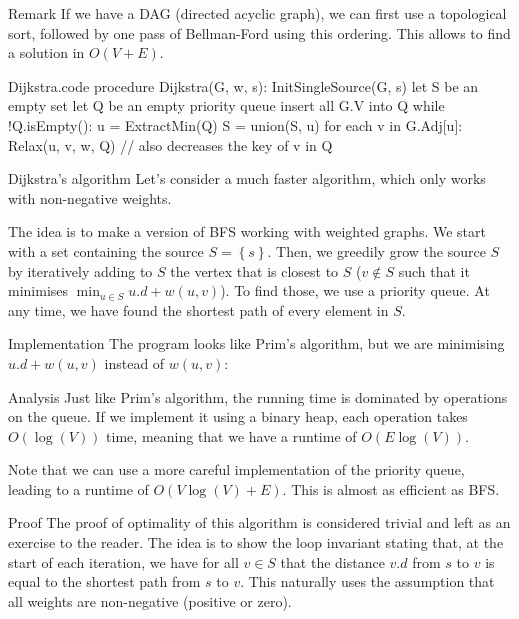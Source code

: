 \documentclass[a4paper]{article}
\begin{document}
\begin{parag}{Remark}
    If we have a DAG (directed acyclic graph), we can first use a topological sort, followed by one pass of Bellman-Ford using this ordering. This allows to find a solution in $O\left(V + E\right)$.
\end{parag}

\begin{filecontents*}[overwrite]{Dijkstra.code}
procedure Dijkstra(G, w, s):
    InitSingleSource(G, s)
    let S be an empty set
    let Q be an empty priority queue
    insert all G.V into Q
    while !Q.isEmpty():
        u = ExtractMin(Q)
        S = union(S, u)
        for each v in G.Adj[u]:
            Relax(u, v, w, Q)  // also decreases the key of v in Q
\end{filecontents*}


\begin{parag}{Dijkstra's algorithm}
    Let's consider a much faster algorithm, which only works with non-negative weights. 

    The idea is to make a version of BFS working with weighted graphs. We start with a set containing the source $S = \left\{s\right\}$. Then, we greedily grow the source $S$ by iteratively adding to $S$ the vertex that is closest to $S$ ($v \not\in S$ such that it minimises $\min_{u \in S} u.d + w\left(u, v\right)$). To find those, we use a priority queue. At any time, we have found the shortest path of every element in $S$.

    \begin{subparag}{Implementation}
        The program looks like Prim's algorithm, but we are minimising $u.d + w\left(u, v\right)$ instead of $w\left(u, v\right)$:
    \end{subparag}

    \begin{subparag}{Analysis}
        Just like Prim's algorithm, the running time is dominated by operations on the queue. If we implement it using a binary heap, each operation takes $O\left(\log\left(V\right)\right)$ time, meaning that we have a runtime of $O\left(E \log \left(V\right)\right)$.

        Note that we can use a more careful implementation of the priority queue, leading to a runtime of $O\left(V \log\left(V\right) + E\right)$. This is almost as efficient as BFS.
    \end{subparag}
    
    \begin{subparag}{Proof}
        The proof of optimality of this algorithm is considered trivial and left as an exercise to the reader. The idea is to show the loop invariant stating that, at the start of each iteration, we have for all $v \in S$ that the distance $v.d$ from $s$ to $v$ is equal to the shortest path from $s$ to $v$. This naturally uses the assumption that all weights are non-negative (positive or zero).
    \end{subparag}
\end{parag}
\end{document}
